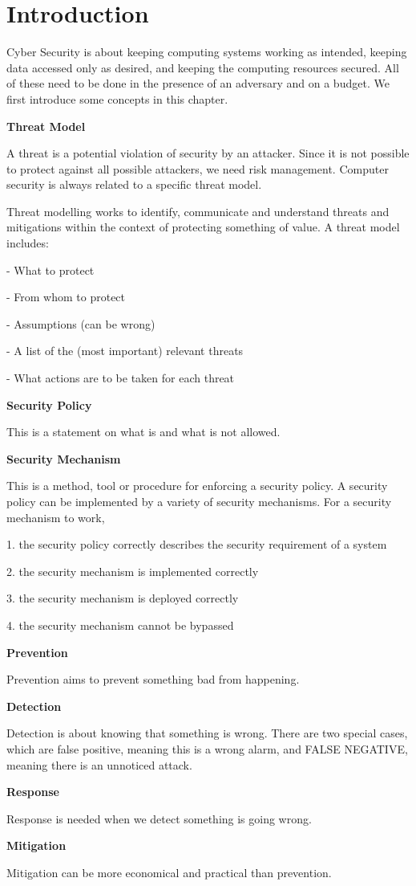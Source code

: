 \chapter{Introduction}

Cyber Security is about keeping computing systems working as intended, keeping data accessed only as desired, and keeping the computing resources secured. All of these need to be done in the presence of an adversary and on a budget. We first introduce some concepts in this chapter. 

\textbf{Threat Model}

A threat is a potential violation of security by an attacker. Since it is not possible to protect against all possible attackers, we need risk management. Computer security is always related to a specific threat model. 

Threat modelling works to identify, communicate and understand threats and mitigations within the context of protecting something of value. A threat model includes:

- What to protect

- From whom to protect

- Assumptions (can be wrong)

- A list of the (most important) relevant threats

- What actions are to be taken for each threat

\textbf{Security Policy} 

This is a statement on what is and what is not allowed. 

\textbf{Security Mechanism}

This is a method, tool or procedure for enforcing a security policy. A security policy can be implemented by a variety of security mechanisms. For a security mechanism to work, 

1. the security policy correctly describes the security requirement of a system

2. the security mechanism is implemented correctly

3. the security mechanism is deployed correctly

4. the security mechanism cannot be bypassed 

\textbf{Prevention} 

Prevention aims to prevent something bad from happening. 

\textbf{Detection} 

Detection is about knowing that something is wrong. There are two special cases, which are false positive, meaning this is a wrong alarm, and FALSE NEGATIVE, meaning there is an unnoticed attack.

\textbf{Response} 

Response is needed when we detect something is going wrong. 

\textbf{Mitigation} 

Mitigation can be more economical and practical than prevention. 